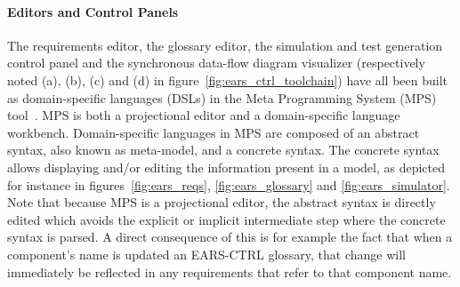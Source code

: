 \paragraph{\textbf{Editors and Control Panels}\\} 
\hspace{-.2cm}
The requirements editor, the glossary editor, the simulation and
test generation control panel and the synchronous data-flow diagram visualizer
(respectively noted (\textsf{a}), (\textsf{b}), (\textsf{c}) and (\textsf{d}) in figure~\ref{fig:ears_ctrl_toolchain}) have all been built as 
domain-specific languages (DSLs) in the Meta Programming System (MPS)
tool~\cite{mps}.
MPS is both a projectional editor and a domain-specific language workbench.
Domain-specific languages in MPS are composed of an abstract syntax, also known
as meta-model, and a concrete syntax. The concrete syntax allows displaying
and/or editing the information present in a model, as depicted for instance in
figures~\ref{fig:ears_reqs}, \ref{fig:ears_glossary} and 
\ref{fig:ears_simulator}. Note that because MPS is a projectional editor, the
abstract syntax is directly edited which avoids the explicit or implicit
intermediate step where the concrete syntax is parsed.
A direct consequence of this is for example the fact that when a component's
name is updated an \textsf{EARS-CTRL} glossary, that change will immediately be
reflected in any requirements that refer to that component name.\vspace{-.2cm}
